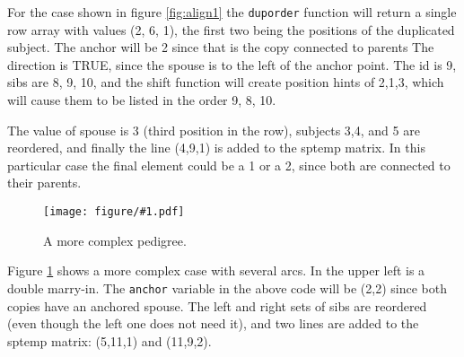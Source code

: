 \documentclass{article}
\newcommand{\myfig}[1]{\resizebox{\textwidth}{!}
                        {\texttt{[image: figure/\#1.pdf]}}}
\begin{document}
For the case shown in figure \ref{fig:align1} the \Verb!duporder! function
will return a single row array with values (2, 6, 1), the first two
being the positions of the duplicated subject.  
The anchor will be 2 since that is the copy connected to parents
The direction is TRUE, since the spouse is to the left of the anchor point.
The id is 9, sibs are 8, 9, 10, and the shift function will create position
hints of 2,1,3, which will cause them to be listed in the order 9, 8, 10.

The value of spouse is 3 (third position in the row), subjects 3,4, and 5
are reordered, and finally the line (4,9,1) is added to the sptemp 
matrix.  
In this particular case the final element could be a 1 or a 2, since both
are connected to their parents.

\begin{figure}
  \myfig{autohint2}
  \caption{A more complex pedigree.}
  \label{fig:align2}
\end{figure}

Figure \ref{fig:align2} shows a more complex case with several arcs.
In the upper left is a double marry-in.
The \Verb!anchor! variable in the above code
will be (2,2) since both copies have an anchored spouse.
The left and right sets of sibs are reordered (even though the left
one does not need it), and two lines are added to the sptemp matrix:
(5,11,1) and (11,9,2).
\end{document}
